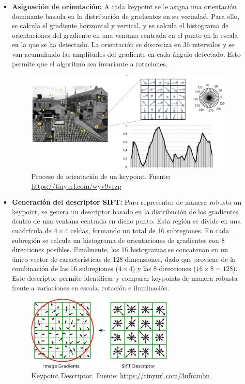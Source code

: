 \documentclass[a4paper]{article}
\begin{document}
\begin{itemize}
      \item \textbf{Asignación de orientación:}  
      A cada keypoint se le asigna una orientación dominante basada en la distribución de gradientes en su vecindad. Para ello, se calcula el gradiente horizontal y vertical, y se calcula el histograma de orientaciones del gradiente en una ventana centrada en el punto en la escala en la que se ha detectado. La orientación 
      se discretiza en 36 intervalos y se van acumulando las amplitudes del gradiente en cada ángulo detectado. Esto permite que el algoritmo sea invariante a rotaciones.
      \begin{figure}[H]
        \centering
        \includegraphics[width=1.1\textwidth]{images/sift_orientacion.png}
        \caption{Proceso de orientación de un keypoint. Fuente: \url{https://tinyurl.com/wyv9vczp}}
    \end{figure}


    \item \textbf{Generación del descriptor SIFT:}  
    Para representar de manera robusta un keypoint, se genera un descriptor basado en la distribución de los gradientes dentro de una ventana centrada en dicho punto.  
    Esta región se divide en una cuadrícula de \(4 \times 4\) celdas, formando un total de 16 subregiones.  
    En cada subregión se calcula un histograma de orientaciones de gradientes con 8 direcciones posibles.  
    Finalmente, los 16 histogramas se concatenan en un único vector de características de 128 dimensiones, dado que proviene de la combinación de las 16 subregiones (\(4 \times 4\)) y las 8 direcciones (\(16 \times 8 = 128\)).  
    Este descriptor permite identificar y comparar keypoints de manera robusta frente a variaciones en escala, rotación e iluminación.

   
      \begin{figure}[H]
        \centering
        \includegraphics[width=0.7\textwidth]{images/sift_descrip.png}
        \caption{Keypoint Descriptor. Fuente: \url{https://tinyurl.com/3ufntmbn}}
    \end{figure}

    \end{itemize}
  
\end{document}
